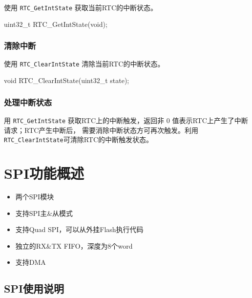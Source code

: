 \documentclass[
  12pt,
]{book}
\newenvironment{Shaded}{\begin{snugshade}}{\end{snugshade}}
\newcommand{\DataTypeTok}[1]{\textcolor[rgb]{0.13,0.29,0.53}{#1}}
\newcommand{\NormalTok}[1]{#1}
\providecommand{\tightlist}{%
  \setlength{\itemsep}{0pt}\setlength{\parskip}{0pt}}
\begin{document}
使用 \texttt{RTC\_GetIntState} 获取当前RTC的中断状态。

\begin{Shaded}
\begin{Highlighting}[]
\DataTypeTok{uint32_t}\NormalTok{ RTC_GetIntState(}\DataTypeTok{void}\NormalTok{);}
\end{Highlighting}
\end{Shaded}

\hypertarget{ux6e05ux9664ux4e2dux65ad}{%
\subsection{清除中断}\label{ux6e05ux9664ux4e2dux65ad}}

使用 \texttt{RTC\_ClearIntState} 清除当前RTC的中断状态。

\begin{Shaded}
\begin{Highlighting}[]
\DataTypeTok{void}\NormalTok{ RTC_ClearIntState(}\DataTypeTok{uint32_t}\NormalTok{ state);}
\end{Highlighting}
\end{Shaded}

\hypertarget{ux5904ux7406ux4e2dux65adux72b6ux6001-1}{%
\subsection{处理中断状态}\label{ux5904ux7406ux4e2dux65adux72b6ux6001-1}}

用 \texttt{RTC\_GetIntState} 获取RTC上的中断触发，返回非 0 值表示RTC上产生了中断请求；RTC产生中断后，
需要消除中断状态方可再次触发。利用 \texttt{RTC\_ClearIntState}可清除RTC的中断触发状态。

\hypertarget{spiux529fux80fdux6982ux8ff0}{%
\chapter{SPI功能概述}\label{spiux529fux80fdux6982ux8ff0}}

\begin{itemize}
\tightlist
\item
  两个SPI模块
\item
  支持SPI主\&从模式
\item
  支持Quad SPI，可以从外挂Flash执行代码
\item
  独立的RX\&TX FIFO，深度为8个word
\item
  支持DMA
\end{itemize}

\hypertarget{spiux4f7fux7528ux8bf4ux660e}{%
\section{SPI使用说明}\label{spiux4f7fux7528ux8bf4ux660e}}
\end{document}
